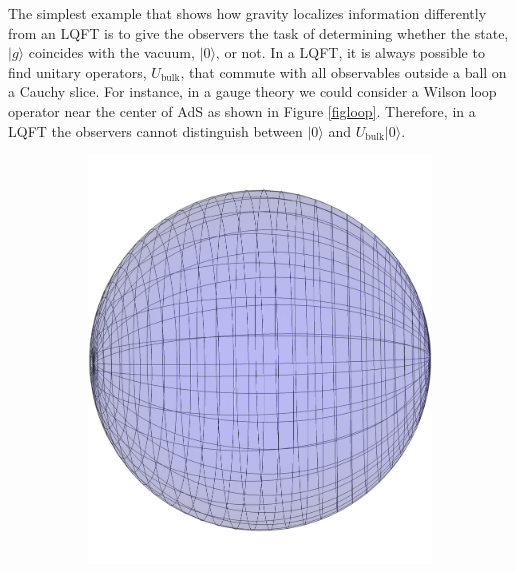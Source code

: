 \documentclass[12pt]{article}
\newcommand{\ubulk}{U_{\text{bulk}}}
\begin{document}
The simplest example that shows how gravity localizes information differently from an LQFT is to give the observers the task of determining whether the state, $|g \rangle$ coincides with the vacuum, $|0 \rangle$, or not. In a LQFT, it is always possible to find unitary operators, $\ubulk$, that  commute with all observables outside a ball on a Cauchy slice.  For instance, in a gauge theory we could consider a Wilson loop operator near the center of AdS as shown in Figure \ref{figloop}.  Therefore, in a LQFT the observers cannot distinguish between $| 0 \rangle$ and $\ubulk | 0 \rangle$.
\begin{figure}[!ht]
\centering
\begin{subfigure}{0.4\textwidth}
\centering
\includegraphics[height=0.3\textheight]{nothinginside.pdf}
\caption{\label{leftfig}}
\end{subfigure}
\hspace{0.15\textwidth}
\begin{subfigure}{0.4\textwidth}
\centering

\end{subfigure}
\end{figure}
\end{document}
